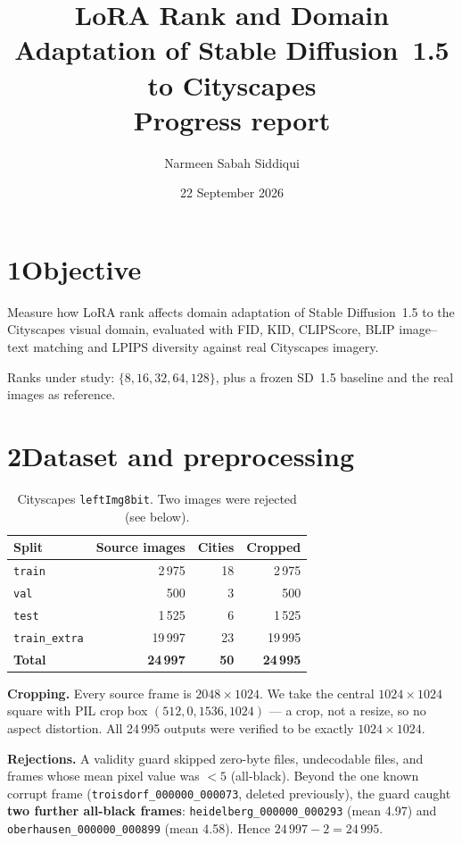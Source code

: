 \documentclass[11pt,a4paper]{article}
\title{\vspace{-1.4cm}\textbf{LoRA Rank and Domain Adaptation of Stable Diffusion~1.5\\to Cityscapes}\\[0.3em]\large Progress report}
\author{Narmeen Sabah Siddiqui}
\date{22 September 2026}
\begin{document}
\maketitle
\vspace{-0.8em}

\section*{1\quad Objective}

Measure how LoRA rank affects domain adaptation of Stable Diffusion~1.5 to the
Cityscapes visual domain, evaluated with FID, KID, CLIPScore, BLIP image--text
matching and LPIPS diversity against real Cityscapes imagery.

Ranks under study: $\{8, 16, 32, 64, 128\}$, plus a frozen SD~1.5 baseline and
the real images as reference.

\section*{2\quad Dataset and preprocessing}

\begin{table}[h]\centering\small
\begin{tabular}{lrrr}
\toprule
Split & Source images & Cities & Cropped \\
\midrule
\texttt{train}       & 2\,975  & 18 & 2\,975 \\
\texttt{val}         & 500     & 3  & 500 \\
\texttt{test}        & 1\,525  & 6  & 1\,525 \\
\texttt{train\_extra}& 19\,997 & 23 & 19\,995 \\
\midrule
\textbf{Total}       & \textbf{24\,997} & \textbf{50} & \textbf{24\,995} \\
\bottomrule
\end{tabular}
\caption{Cityscapes \texttt{leftImg8bit}. Two images were rejected (see below).}
\end{table}

\textbf{Cropping.} Every source frame is $2048\times1024$. We take the central
$1024\times1024$ square with PIL crop box $(512,0,1536,1024)$ --- a crop, not a
resize, so no aspect distortion. All 24\,995 outputs were verified to be exactly
$1024\times1024$.

\textbf{Rejections.} A validity guard skipped zero-byte files, undecodable
files, and frames whose mean pixel value was $<5$ (all-black). Beyond the one
known corrupt frame (\texttt{troisdorf\_000000\_000073}, deleted previously), the
guard caught \textbf{two further all-black frames}:
\texttt{heidelberg\_000000\_000293} (mean 4.97) and
\texttt{oberhausen\_000000\_000899} (mean 4.58). Hence $24\,997 - 2 = 24\,995$.
\end{document}
